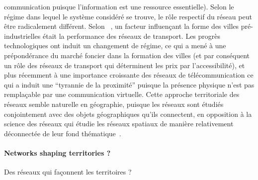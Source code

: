 {communication puisque l'information est une ressource essentielle). Selon le régime dans lequel le système considéré se trouve, le rôle respectif du réseau peut être radicalement différent. Selon ~\cite{duranton1999distance}, un facteur influençant la forme des villes pré-industrielles était la performance des réseaux de transport. Les progrès technologiques ont induit un changement de régime, ce qui a mené à une prépondérance du marché foncier dans la formation des villes (et par conséquent un rôle des réseaux de transport qui déterminent les prix par l'accessibilité), et plus récemment à une importance croissante des réseaux de télécommunication ce qui a induit une ``tyrannie de la proximité'' puisque la présence physique n'est pas remplaçable par une communication virtuelle. Cette approche territoriale des réseaux semble naturelle en géographie, puisque les réseaux sont étudiés conjointement avec des objets géographiques qu'ils connectent, en opposition à la science des réseaux qui étudie les réseaux spatiaux de manière relativement déconnectée de leur fond thématique~\cite{ducruet2014spatial}.
}

\paragraph{Networks shaping territories ?}{Des réseaux qui façonnent les territoires ?}

